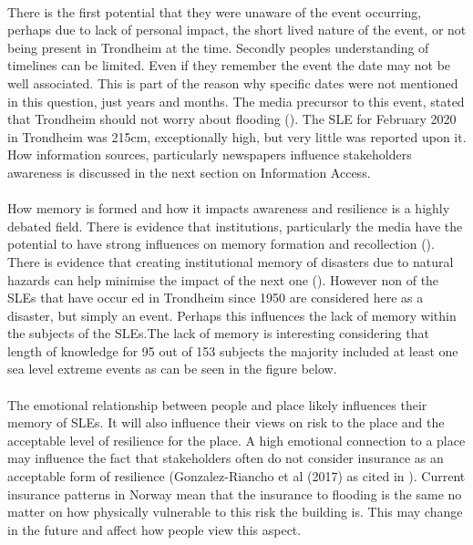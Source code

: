 \paragraph{}
There is the first potential that they were unaware of the event occurring, perhaps due to lack of personal impact, the short lived nature of the event, or not being present in Trondheim at the time. Secondly peoples understanding of timelines can be limited. Even if they remember the event the date may not be well associated. This is part of the reason why specific dates were not mentioned in this question, just years and months. 
The media precursor to this event, stated that Trondheim should not worry about flooding (\cite{baisotti_danger_2020}). The SLE for February 2020 in Trondheim was 215cm, exceptionally high, but very little was reported upon it. How information sources, particularly newspapers influence stakeholders awareness is discussed in the next section on Information Access.
\paragraph{}
How memory is formed and how it impacts awareness and resilience is a highly debated field. There is evidence that institutions, particularly the media have the potential to have strong influences on memory formation and recollection (\cite{de_guttry_expiry_2022}). There is evidence that creating institutional memory of disasters due to natural hazards can help minimise the impact of the next one (\cite{de_guttry_expiry_2022}). However non of the SLEs that have occur ed in Trondheim since 1950 are considered here as a disaster, but simply an event. Perhaps this influences the lack of memory within the subjects of the SLEs.The lack of memory is interesting considering that length of knowledge for 95 out of 153 subjects the majority included at least one sea level extreme events as can be seen in the figure below. 
\paragraph{}

The emotional relationship between people and place likely influences their memory of SLEs. It will also influence their views on risk to the place and the acceptable level of resilience for the place. A high emotional connection to a place may influence the fact that stakeholders often do not consider insurance as an acceptable form of resilience (Gonzalez-Riancho et al (2017) as cited in \cite{gerkensmeier_governing_2018}). Current insurance patterns in Norway mean that the insurance to flooding is the same no matter on how physically vulnerable to this risk the building is. This may change in the future and affect how people view this aspect.
